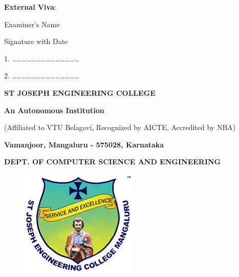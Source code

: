 \documentclass[12pt,a4paper]{report}
\begin{document}
\begin{center}
\large \textbf{External Viva}:
\end{center}
\begin{flushleft}
\begin{normalsize}Examiner's Name \end{normalsize}
\hspace{6.5cm}
\begin{normalsize}Signature with Date\end{normalsize}
\end{flushleft}
\vspace{0.1in}
\begin{flushleft}
1. \ldots\ldots\ldots\ldots\ldots\ldots \ldots \hspace{5.8cm}\ldots\ldots\ldots\ldots \ldots\ldots\ldots 
\par
\vspace{0.2in}	
2. \ldots\ldots\ldots\ldots\ldots\ldots \ldots \hspace{5.8cm}\ldots\ldots\ldots\ldots \ldots\ldots\ldots 
\end{flushleft}
\newpage

\centering
\LARGE \textbf{ST JOSEPH ENGINEERING COLLEGE}
\par
\Large \textbf{An Autonomous Institution}
\par \large{(Affiliated to VTU Belagavi, Recognized by AICTE, Accredited by NBA)}
\par \vspace{3pt}
\large \textbf{Vamanjoor, Mangaluru - 575028, Karnataka}
\par \vspace{12pt}  
\par
\large \textbf{DEPT. OF COMPUTER SCIENCE AND ENGINEERING}
\par
\begin{figure}[hbtp]
\centering
\includegraphics[scale=0.5]{./pic/sjeclogo}
\end{figure}
\end{document}

